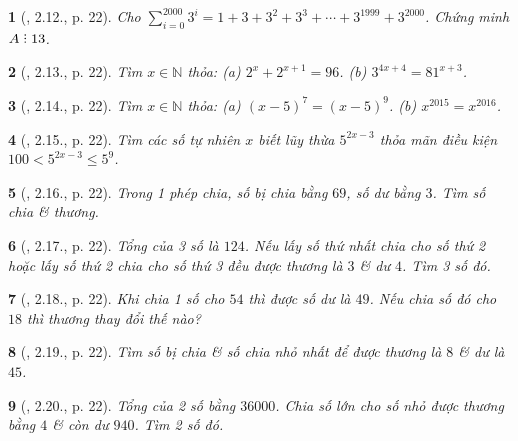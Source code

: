 \documentclass{article}
\newtheorem{baitoan}{}
\DeclareRobustCommand{\divby}{%
	\mathrel{\vbox{\baselineskip.65ex\lineskiplimit0pt\hbox{.}\hbox{.}\hbox{.}}}%
}
\begin{document}
\begin{baitoan}[\cite{Binh_boi_duong_Toan_6_tap_1}, 2.12., p. 22]
	Cho $\sum_{i=0}^{2000} 3^i = 1 + 3 + 3^2 + 3^3 + \cdots + 3^{1999} + 3^{2000}$. Chứng minh $A\divby13$.
\end{baitoan}

\begin{baitoan}[\cite{Binh_boi_duong_Toan_6_tap_1}, 2.13., p. 22]
	Tìm $x\in\mathbb{N}$ thỏa: (a) $2^x + 2^{x + 1} = 96$. (b) $3^{4x + 4} = 81^{x + 3}$.
\end{baitoan}

\begin{baitoan}[\cite{Binh_boi_duong_Toan_6_tap_1}, 2.14., p. 22]
	Tìm $x\in\mathbb{N}$ thỏa: (a) $(x - 5)^7 = (x - 5)^9$. (b) $x^{2015} = x^{2016}$.
\end{baitoan}

\begin{baitoan}[\cite{Binh_boi_duong_Toan_6_tap_1}, 2.15., p. 22]
	Tìm các số tự nhiên $x$ biết lũy thừa $5^{2x - 3}$ thỏa mãn điều kiện $100 < 5^{2x - 3}\le5^9$.
\end{baitoan}

\begin{baitoan}[\cite{Binh_boi_duong_Toan_6_tap_1}, 2.16., p. 22]
	Trong 1 phép chia, số bị chia bằng $69$, số dư bằng $3$. Tìm số chia \& thương.
\end{baitoan}

\begin{baitoan}[\cite{Binh_boi_duong_Toan_6_tap_1}, 2.17., p. 22]
	Tổng của 3 số là $124$. Nếu lấy số thứ nhất chia cho số thứ 2 hoặc lấy số thứ 2 chia cho số thứ 3 đều được thương là $3$ \& dư $4$. Tìm 3 số đó.
\end{baitoan}

\begin{baitoan}[\cite{Binh_boi_duong_Toan_6_tap_1}, 2.18., p. 22]
	Khi chia 1 số cho $54$ thì được số dư là $49$. Nếu chia số đó cho $18$ thì thương thay đổi thế nào?
\end{baitoan}

\begin{baitoan}[\cite{Binh_boi_duong_Toan_6_tap_1}, 2.19., p. 22]
	Tìm số bị chia \& số chia nhỏ nhất để được thương là $8$ \& dư là $45$.
\end{baitoan}

\begin{baitoan}[\cite{Binh_boi_duong_Toan_6_tap_1}, 2.20., p. 22]
	Tổng của 2 số bằng $36000$. Chia số lớn cho số nhỏ được thương bằng $4$ \& còn dư $940$. Tìm 2 số đó.
\end{baitoan}
\end{document}
